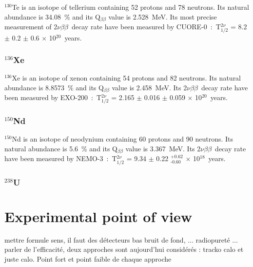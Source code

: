 \documentclass[main.tex]{subfiles}
\begin{document}
\NI $^\text{130}$Te is an isotope of tellerium containing 52 protons and 78 neutrons. Its natural abundance is 34.08~\% and its Q$_{\beta\beta}$ value is 2.528~MeV. Its most precise measurement of 2$\nu\beta\beta$~decay rate have been measured by CUORE-0~:~T$_{\text{1/2}}^{\text{2}\nu}$ = 8.2 $\pm$ 0.2 $\pm$ 0.6 $\times$ 10$^{\text{20}}$~years.


\subsubsection{$^{\text{136}}$Xe}


\NI $^\text{136}$Xe is an isotope of xenon containing 54 protons and 82 neutrons. Its natural abundance is 8.8573~\% and its Q$_{\beta\beta}$ value is 2.458~MeV. Its 2$\nu\beta\beta$~decay rate have been measured by EXO-200~:~T$_{\text{1/2}}^{\text{2}\nu}$ = 2.165 $\pm$ 0.016 $\pm$ 0.059 $\times$ 10$^{\text{20}}$~years.


\subsubsection{$^{\text{150}}$Nd}


\NI $^\text{150}$Nd is an isotope of neodynium containing 60 protons and 90 neutrons. Its natural abundance is 5.6~\% and its Q$_{\beta\beta}$ value is 3.367~MeV. Its 2$\nu\beta\beta$~decay rate have been measured by NEMO-3~:~T$_{\text{1/2}}^{\text{2}\nu}$ = 9.34 $\pm$ 0.22 $^{\text{+0.62}}_{\text{-0.60}}$ $\times$ 10$^{\text{18}}$~years.


\subsubsection{$^{\text{238}}$U}
\NI 









\FloatBarrier


\section{Experimental point of view}\label{sec:ExperimentalSearches}
\NI mettre formule sens, il faut des détecteurs bas bruit de fond, ... radiopureté ... parler de l'efficacité,
\NI deux approches sont aujourd'hui considérés : tracko calo et juste calo. Point fort et point faible de chaque approche


\FloatBarrier
\end{document}
